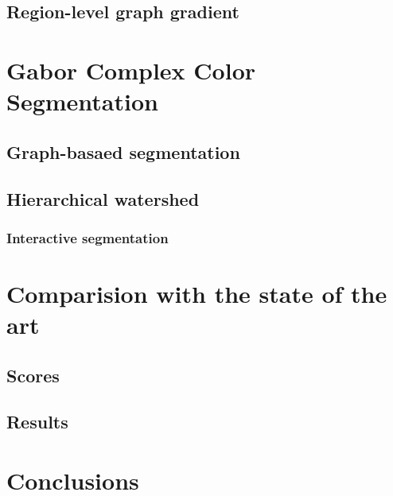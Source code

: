 \documentclass[11pt,a4paper,onecolumn]{article}
\begin{document}
\subsection{Region-level graph gradient}

\section{Gabor Complex Color Segmentation}
\subsection{Graph-basaed segmentation}
\subsection{Hierarchical watershed}
\subsubsection{Interactive segmentation}

\section{Comparision with the state of the art}
\subsection{Scores}
\subsection{Results}

\section{Conclusions}
\end{document}
